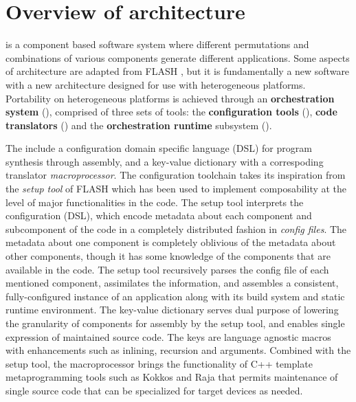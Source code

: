 \chapter{Overview of \flashx architecture}
\label{Chp:Architecture}

\flashx is a component based software system where different
permutations and combinations of various components generate different
applications. Some aspects of \flashx architecture are adapted 
from FLASH \cite{Dubey2009}, but it is fundamentally a new software with a new
architecture designed for use with heterogeneous
platforms. Portability on heterogeneous platforms is achieved through an
\textbf{orchestration system} (\OS), comprised of three sets of tools: the
  \textbf{configuration tools} (\CFT), \textbf{code translators} (\CT)
  and the \textbf{orchestration runtime} subsystem (\OR).

  The {\CFT} include a configuration domain specific language (DSL) for program
synthesis through assembly, and a key-value dictionary with a correspoding translator {\it
  macroprocessor}. The configuration toolchain takes its inspiration from the {\it setup
  tool} of FLASH which has been used to implement
composability at the level of major functionalities in the code.  The
setup tool interprets the configuration (DSL), which encode metadata about each component
and  subcomponent of the code in a completely distributed fashion in
{\it config files}. The metadata about one component is completely
oblivious of the metadata about other components, though it has
some knowledge of the components that are available in the code. The
setup tool recursively parses the config file of each mentioned
component, assimilates the information, and assembles a consistent,
fully-configured instance of an application along with its build
system and static runtime environment. The key-value dictionary serves
dual purpose of lowering the granularity of components for assembly by
the setup tool, and enables single expression of maintained source
code. The keys are language agnostic macros with enhancements such as
inlining, recursion and arguments. Combined with the setup tool, the
macroprocessor brings the functionality of C++ template
metaprogramming tools such as Kokkos and Raja that permits 
maintenance of single source code that can be specialized for target
devices as needed.


